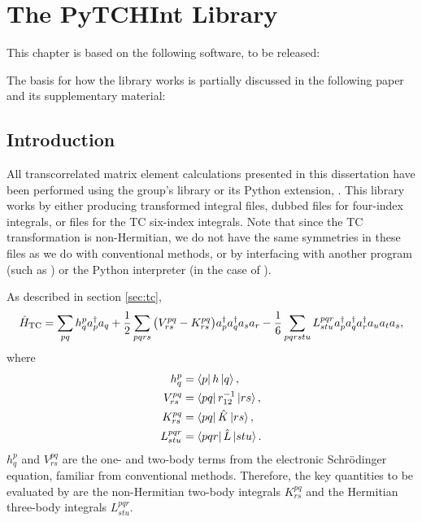 \chapter{The PyTCHInt Library}
\label{chap:pytchint}

This chapter is based on the following software, to be released:\\

The basis for how the library works is partially discussed in the following paper and its supplementary material: \\

\section{Introduction}

All transcorrelated matrix element calculations presented in this dissertation have been performed using the group's \tchint library or its Python extension, \pytchint. This library works by either producing transformed integral files, dubbed \fcidump files for four-index integrals,\supercite{knowlesDeterminant1989} or \tcdump files for the \gls{TC} six-index integrals. Note that since the \gls{TC} transformation is non-Hermitian, we do not have the same symmetries in these files as we do with conventional methods, or by interfacing with another program (such as \neci) or the Python interpreter (in the case of \pytchint).

As described in section \ref{sec:tc},
\begin{equation}
    \hat H_\mathrm{TC} = \sum_{pq} h_q^p a_p^\dagger a_q
    + \frac{1}{2} \sum_{pqrs} \big(V_{rs}^{pq} - K_{rs}^{pq}\big)
    a_p^\dagger a_q^\dagger a_s a_r
    - \frac{1}{6} \sum_{pqrstu} L_{stu}^{pqr}
    a_p^\dagger a_q^\dagger a_r^\dagger a_u a_t a_s,
\end{equation}
where
\begin{equation}
\begin{split}
    h_q^p &= \bra{p}h\ket{q}, \\
    V_{rs}^{pq} &= \bra{p q } r_{12}^{-1} \ket{ r s}, \\
    K_{rs}^{pq} &= \bra{p q } \hat{K} \ket{ r s}, \\
    L_{stu}^{pqr} &= \bra{p q r } \hat{L} \ket{s t u}.
\end{split}
\end{equation}
$h_q^p$ and $V_{rs}^{pq}$ are the one- and two-body terms from the electronic Schr\"odinger equation, familiar from conventional methods. Therefore, the key quantities to be evaluated by \tchint are the non-Hermitian two-body integrals $K_{rs}^{pq}$ and the Hermitian three-body integrals $L_{stu}^{pqr}$.

